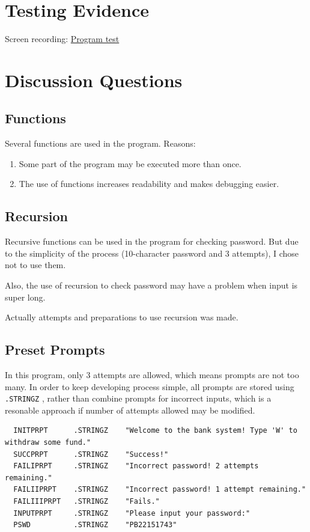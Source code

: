 \documentclass[UTF8]{ctexart}
\begin{document}
\section{Testing Evidence}
Screen recording: \href{https://rec.ustc.edu.cn/share/ed2c2e60-a262-11ee-861b-01b0339fadfa}{Program test} 
\section{Discussion Questions}
\subsection{Functions}
Several functions are used in the program. Reasons:
\begin{enumerate}
  \item Some part of the program may be executed more than once.
  \item The use of functions increases readability and makes debugging easier.
\end{enumerate}
\subsection{Recursion}
Recursive functions can be used in the program for checking password. But due to the simplicity of the process
(10-character password and 3 attempts), I chose not to use them. 

Also, the use of recursion to check password may have a problem when input is 
super long.

Actually attempts and preparations to use recursion was made.
\subsection{Preset Prompts}
In this program, only 3 attempts are allowed, which means prompts are not too many. 
In order to keep developing process simple, all prompts are stored using \lstinline{.STRINGZ}
, rather than combine prompts for incorrect inputs, which is a resonable approach if number of attempts allowed may be modified.
\begin{lstlisting}
  INITPRPT      .STRINGZ    "Welcome to the bank system! Type 'W' to withdraw some fund."
  SUCCPRPT      .STRINGZ    "Success!"
  FAILIPRPT     .STRINGZ    "Incorrect password! 2 attempts remaining."
  FAILIIPRPT    .STRINGZ    "Incorrect password! 1 attempt remaining."
  FAILIIIPRPT   .STRINGZ    "Fails."
  INPUTPRPT     .STRINGZ    "Please input your password:"
  PSWD          .STRINGZ    "PB22151743"
\end{lstlisting}
\end{document}
